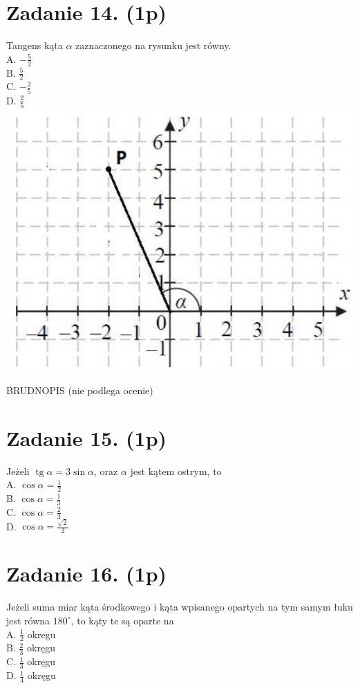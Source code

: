 \documentclass[10pt]{article}
\begin{document}
\section*{Zadanie 14. (1p)}
Tangens kąta \(\alpha\) zaznaczonego na rysunku jest równy.\\
A. \(-\frac{5}{2}\)\\
B. \(\frac{5}{2}\)\\
C. \(-\frac{2}{5}\)\\
D. \(\frac{2}{5}\)\\
\includegraphics[max width=\textwidth, center]{2024_11_21_2a465a6670163fcfd70dg-04(1)}

BRUDNOPIS (nie podlega ocenie)

\section*{Zadanie 15. (1p)}
Jeżeli \(\operatorname{tg} \alpha=3 \sin \alpha\), oraz \(\alpha\) jest kątem ostrym, to\\
A. \(\cos \alpha=\frac{1}{2}\)\\
B. \(\cos \alpha=\frac{1}{3}\)\\
C. \(\cos \alpha=\frac{2}{3}\)\\
D. \(\cos \alpha=\frac{\sqrt{2}}{2}\)

\section*{Zadanie 16. (1p)}
Jeżeli suma miar kąta środkowego i kąta wpisanego opartych na tym samym łuku jest równa \(180^{\circ}\), to kąty te są oparte na\\
A. \(\frac{1}{2}\) okregu\\
B. \(\frac{2}{3}\) okręgu\\
C. \(\frac{1}{3}\) okręgu\\
D. \(\frac{1}{4}\) okręgu
\end{document}
